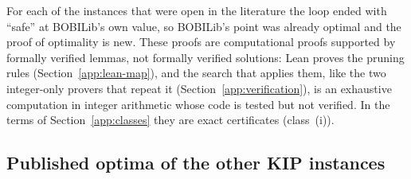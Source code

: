 For each of the \NumNewKip{} instances that were open in the literature the loop ended
with ``safe'' at BOBILib's own value, so BOBILib's point was already optimal
and the proof of optimality is new. These proofs are computational proofs
supported by formally verified lemmas, not formally verified solutions: Lean
proves the pruning rules (Section~\ref{app:lean-map}), and the search that
applies them, like the two integer-only provers that repeat it
(Section~\ref{app:verification}), is an exhaustive computation in integer
arithmetic whose code is tested but not verified. In the terms of
Section~\ref{app:classes} they are exact certificates (class~(i)).

\subsection{Published optima of the other KIP instances}\label{app:kip-lit}

